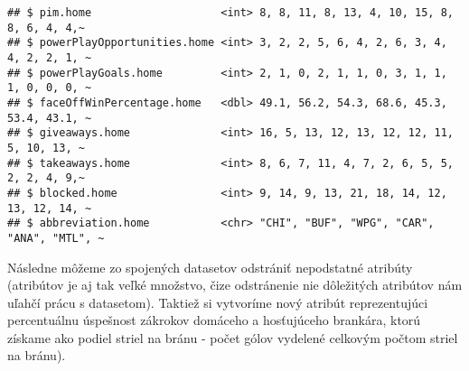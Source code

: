 \documentclass[
]{article}
\newenvironment{Shaded}{\begin{snugshade}}{\end{snugshade}}
\newcommand{\AttributeTok}[1]{\textcolor[rgb]{0.77,0.63,0.00}{#1}}
\newcommand{\DecValTok}[1]{\textcolor[rgb]{0.00,0.00,0.81}{#1}}
\newcommand{\FunctionTok}[1]{\textcolor[rgb]{0.00,0.00,0.00}{#1}}
\newcommand{\NormalTok}[1]{#1}
\newcommand{\OtherTok}[1]{\textcolor[rgb]{0.56,0.35,0.01}{#1}}
\newcommand{\SpecialCharTok}[1]{\textcolor[rgb]{0.00,0.00,0.00}{#1}}
\newcommand{\StringTok}[1]{\textcolor[rgb]{0.31,0.60,0.02}{#1}}
\begin{document}
\begin{verbatim}
## $ pim.home                    <int> 8, 8, 11, 8, 13, 4, 10, 15, 8, 8, 6, 4, 4,~
## $ powerPlayOpportunities.home <int> 3, 2, 2, 5, 6, 4, 2, 6, 3, 4, 4, 2, 2, 1, ~
## $ powerPlayGoals.home         <int> 2, 1, 0, 2, 1, 1, 0, 3, 1, 1, 1, 0, 0, 0, ~
## $ faceOffWinPercentage.home   <dbl> 49.1, 56.2, 54.3, 68.6, 45.3, 53.4, 43.1, ~
## $ giveaways.home              <int> 16, 5, 13, 12, 13, 12, 12, 11, 5, 10, 13, ~
## $ takeaways.home              <int> 8, 6, 7, 11, 4, 7, 2, 6, 5, 5, 2, 2, 4, 9,~
## $ blocked.home                <int> 9, 14, 9, 13, 21, 18, 14, 12, 13, 12, 14, ~
## $ abbreviation.home           <chr> "CHI", "BUF", "WPG", "CAR", "ANA", "MTL", ~
\end{verbatim}

Následne môžeme zo spojených datasetov odstrániť nepodstatné atribúty
(atribútov je aj tak veľké množstvo, čize odstránenie nie dôležitých
atribútov nám uľahčí prácu s datasetom). Taktiež si vytvoríme nový
atribút reprezentujúci percentuálnu úspešnost zákrokov domáceho a
hosťujúceho brankára, ktorú získame ako podiel striel na bránu - počet
gólov vydelené celkovým počtom striel na bránu).

\begin{Shaded}
\end{Shaded}
\end{document}
